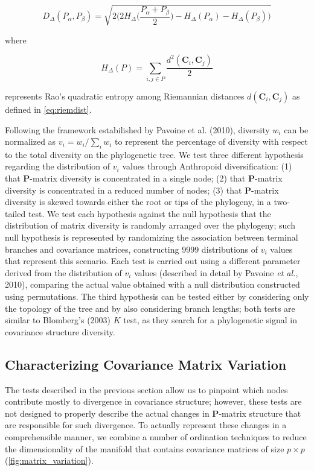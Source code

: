 \documentclass[12pt,twoside]{report}
\begin{document}
\begin{equation}
D_{\Delta} (P_\alpha, P_\beta) =
\sqrt{2 \bigg( 2 H_{\Delta} \bigg( \frac{P_\alpha + P_\beta}{2} \bigg) -
H_{\Delta}(P_\alpha) - H_{\Delta}(P_\beta) \bigg)}
\label{eq:distdist}
\end{equation}

where

\begin{equation}
H_{\Delta} (P) = \sum_{i,j \in P} \frac{d^2(\mathbf{C}_i, \mathbf{C}_j)}{2}
\label{eq:rao}
\end{equation}

represents Rao's quadratic entropy among Riemannian distances
$d(\mathbf{C}_i, \mathbf{C}_j)$ as defined in \autoref{eq:riemdist}.

Following the framework estabilished by Pavoine et al. (2010), diversity
$w_i$ can be normalized as $v_i = w_i / \sum_i w_i$ to represent the
percentage of diversity with respect to the total diversity on the
phylogenetic tree. We test three different hypothesis regarding the
distribution of $v_i$ values through Anthropoid diversification: (1)
that $\mathbf{P}$-matrix diversity is concentrated in a single node; (2)
that $\mathbf{P}$-matrix diversity is concentrated in a reduced number
of nodes; (3) that $\mathbf{P}$-matrix diversity is skewed towards
either the root or tips of the phylogeny, in a two-tailed test. We test
each hypothesis against the null hypothesis that the distribution of
matrix diversity is randomly arranged over the phylogeny; such null
hypothesis is represented by randomizing the association between
terminal branches and covariance matrices, constructing $9999$
distributions of $v_i$ values that represent this scenario. Each test is
carried out using a different parameter derived from the distribution of
$v_i$ values (described in detail by Pavoine \emph{et al.}, 2010),
comparing the actual value obtained with a null distribution constructed
using permutations. The third hypothesis can be tested either by
considering only the topology of the tree and by also considering branch
lengths; both tests are similar to Blomberg's (2003) $K$ test, as they
search for a phylogenetic signal in covariance structure diversity.

\subsection{Characterizing Covariance Matrix
Variation}\label{characterizing-covariance-matrix-variation}

The tests described in the previous section allow us to pinpoint which
nodes contribute mostly to divergence in covariance structure; however,
these tests are not designed to properly describe the actual changes in
$\mathbf{P}$-matrix structure that are responsible for such divergence.
To actually represent these changes in a comprehensible manner, we
combine a number of ordination techniques to reduce the dimensionality
of the manifold that contains covariance matrices of size $p \times p$
(\autoref{fig:matrix_variation}).
\end{document}
